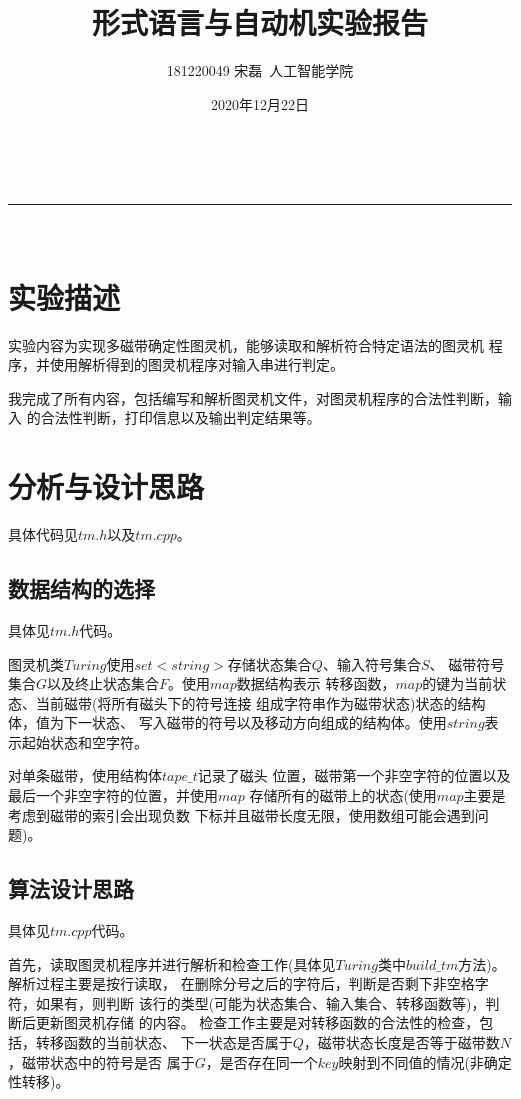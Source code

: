 \documentclass[a4paper,11pt]{ctexart}
\makeatletter
\newcommand{\linia}{\rule{\linewidth}{0.5pt}}
\theoremstyle{mytheor}
\renewcommand{\maketitle}{
\begin{center}
\vspace{2ex}
{\huge \textsc{\@title}}
\vspace{1ex}
\\
\linia\\
\@author \hfill \@date
\vspace{4ex}
\end{center}
}
\makeatother
\begin{document}
\title{形式语言与自动机实验报告}

\author{181220049 宋磊\ 人工智能学院}

\date{2020年12月22日}

\maketitle

\section{实验描述}

实验内容为实现多磁带确定性图灵机，能够读取和解析符合特定语法的图灵机
程序，并使用解析得到的图灵机程序对输入串进行判定。

我完成了所有内容，包括编写和解析图灵机文件，对图灵机程序的合法性判断，输入
的合法性判断，打印信息以及输出判定结果等。

\section{分析与设计思路}

具体代码见$tm.h$以及$tm.cpp$。

\subsection{数据结构的选择}

具体见$tm.h$代码。

图灵机类$Turing$使用$set<string>$存储状态集合$Q$、输入符号集合$S$、
磁带符号集合$G$以及终止状态集合$F$。使用$map$数据结构表示
转移函数，$map$的键为当前状态、当前磁带(将所有磁头下的符号连接
组成字符串作为磁带状态)状态的结构体，值为下一状态、
写入磁带的符号以及移动方向组成的结构体。使用$string$表示起始状态和空字符。

对单条磁带，使用结构体$tape\_t$记录了磁头
位置，磁带第一个非空字符的位置以及最后一个非空字符的位置，并使用$map$
存储所有的磁带上的状态(使用$map$主要是考虑到磁带的索引会出现负数
下标并且磁带长度无限，使用数组可能会遇到问题)。

\subsection{算法设计思路}

具体见$tm.cpp$代码。

首先，读取图灵机程序并进行解析和检查工作(具体见$Turing$类中$build\_tm$方法)。
解析过程主要是按行读取，
在删除分号之后的字符后，判断是否剩下非空格字符，如果有，则判断
该行的类型(可能为状态集合、输入集合、转移函数等)，判断后更新图灵机存储
的内容。
检查工作主要是对转移函数的合法性的检查，包括，转移函数的当前状态、
下一状态是否属于$Q$，磁带状态长度是否等于磁带数$N$，磁带状态中的符号是否
属于$G$，是否存在同一个$key$映射到不同值的情况(非确定性转移)。
\end{document}
